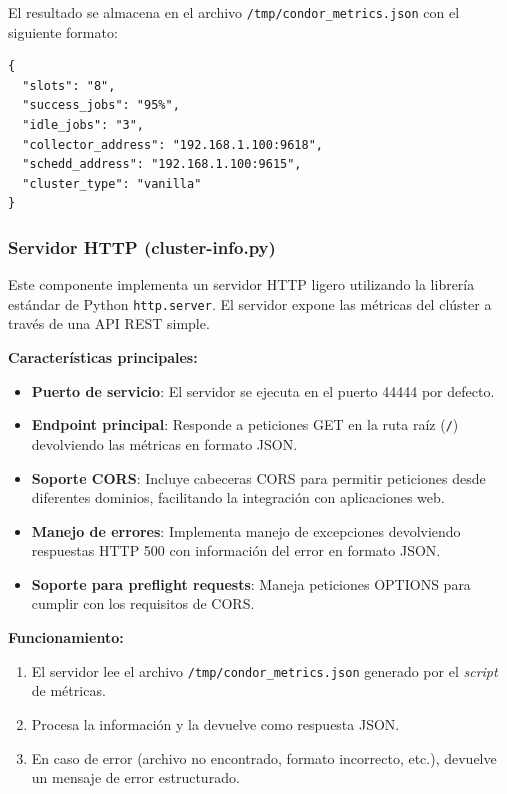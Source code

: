El resultado se almacena en el archivo \texttt{/tmp/condor\_metrics.json} con el siguiente formato:

\begin{verbatim}
{
  "slots": "8",
  "success_jobs": "95%",
  "idle_jobs": "3",
  "collector_address": "192.168.1.100:9618",
  "schedd_address": "192.168.1.100:9615",
  "cluster_type": "vanilla"
}
\end{verbatim}

\subsubsection{Servidor HTTP (cluster-info.py)}
\noindent

Este componente implementa un servidor HTTP ligero utilizando la librería estándar de Python \texttt{http.server}. El servidor expone las métricas del clúster a través de una API REST simple.

\textbf{Características principales:}

\begin{itemize}
	\item \textbf{Puerto de servicio}: El servidor se ejecuta en el puerto 44444 por defecto.

	\item \textbf{Endpoint principal}: Responde a peticiones GET en la ruta raíz (\texttt{/}) devolviendo las métricas en formato JSON.

	\item \textbf{Soporte CORS}: Incluye cabeceras CORS para permitir peticiones desde diferentes dominios, facilitando la integración con aplicaciones web.

	\item \textbf{Manejo de errores}: Implementa manejo de excepciones devolviendo respuestas HTTP 500 con información del error en formato JSON.

	\item \textbf{Soporte para preflight requests}: Maneja peticiones OPTIONS para cumplir con los requisitos de CORS.
\end{itemize}

\textbf{Funcionamiento:}

\begin{enumerate}
	\item El servidor lee el archivo \texttt{/tmp/condor\_metrics.json} generado por el \textit{script} de métricas.
	\item Procesa la información y la devuelve como respuesta JSON.
	\item En caso de error (archivo no encontrado, formato incorrecto, etc.), devuelve un mensaje de error estructurado.
\end{enumerate}

